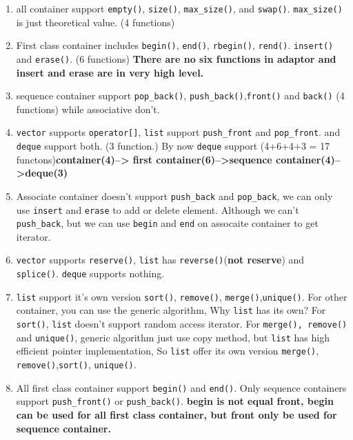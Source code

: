 \documentclass[a4paper,11pt,twoside]{book}
\begin{document}
\begin{itemize}
\begin{enumerate}
\item all container support \texttt{empty()}, \texttt{size()}, \texttt{max\_size()}, and \texttt{swap()}. \texttt{max\_size() }is just theoretical value. (4  functions)

\item First class container includes \texttt{begin()}, \texttt{end()}, \texttt{rbegin()}, \texttt{rend()}. \texttt{insert()} and \texttt{erase()}. (6 functions) \textbf{There are no six functions in adaptor and insert and erase are in very high level.}

\item sequence container support \texttt{pop\_back()}, \texttt{push\_back()},\texttt{front()} and \texttt{back()} (4 functions)
 while associative don't.
 
\item \texttt{vector} supports \texttt{operator[]}, \texttt{list} support \texttt{push\_front} and \texttt{pop\_front}. and \texttt{deque} support both. (3 function.)  By now \texttt{deque} support (4+6+4+3 = 17 functons)\textbf{container(4)--> first container(6)-->sequence container(4)-->deque(3)}

\item Associate container doesn't support \texttt{push\_back} and \texttt{pop\_back}, we can only use \texttt{insert} and \texttt{erase} to add or delete element. Although we can't \texttt{push\_back}, but we can use \texttt{begin} and \texttt{end} on assocaite container to get iterator.

\item \texttt{vector} supports \texttt{reserve()}, \texttt{list} has \texttt{reverse()}(\textbf{not reserve}) and \texttt{splice()}.  \texttt{deque} supports nothing.

\item \texttt{list} support it's own  version \texttt{sort()}, \texttt{remove()}, \texttt{merge()},\texttt{unique()}. For other container, you can use the generic algorithm, Why \texttt{list} has its own? For \texttt{sort()}, \texttt{list} doesn't support random access iterator. For \texttt{merge(), remove()} and \texttt{unique()}, generic algorithm just use copy method, but \texttt{list} has high efficient pointer implementation, So \texttt{list} offer its own version \texttt{merge()}, \texttt{remove()},\texttt{sort()}, \texttt{unique()}.

\item All first class container support \texttt{begin()} and \texttt{end()}. Only sequence containers support \texttt{push\_front()} or \texttt{push\_back()}. \textbf{begin is not equal front, begin can be used for all first class container, but front only be used for sequence container.}


\end{enumerate}
\end{itemize}
\end{document}
